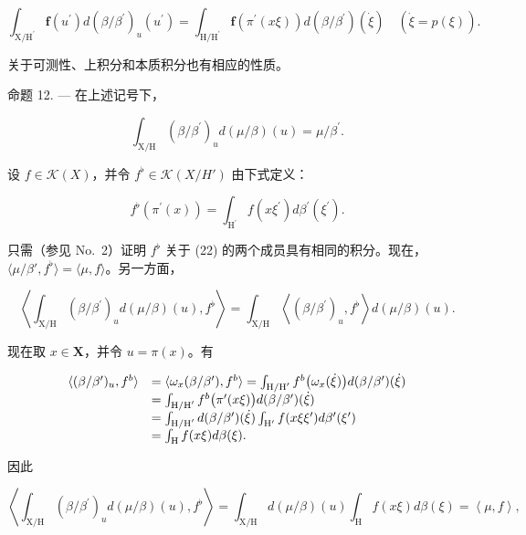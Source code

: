 \[
\int_ {\mathrm{X} / \mathrm{H} ^ {\prime}} \mathbf {f} (u ^ {\prime}) d (\beta / \beta^ {\prime}) _ {u} (u ^ {\prime}) = \int_ {\mathrm{H} / \mathrm{H} ^ {\prime}} \mathbf {f} \left(\pi^ {\prime} (x \xi)\right) d (\beta / \beta^ {\prime}) (\dot {\xi}) \quad \left(\dot {\xi} = p (\xi)\right).\tag{21}
\]

关于可测性、上积分和本质积分也有相应的性质。

命题 12. --- 在上述记号下，

\[
\int_ {\mathrm{X/H}} (\beta / \beta^ {\prime}) _ {u} d (\mu / \beta) (u) = \mu / \beta^ {\prime}.\tag{22}
\]

设 \(f \in \mathcal{K}(X)\)，并令 \(f^{\flat} \in \mathcal{K}(X/H')\) 由下式定义：

\[
f ^ {\flat} \left(\pi^ {\prime} (x)\right) = \int_ {\mathrm{H} ^ {\prime}} f \left(x \xi^ {\prime}\right) d \beta^ {\prime} \left(\xi^ {\prime}\right).
\]

只需（参见 No.~2）证明 \(f^{\flat}\) 关于 (22) 的两个成员具有相同的积分。现在，\(\langle \mu / \beta', f^{\flat} \rangle = \langle \mu, f \rangle\)。另一方面，

\[
\left\langle \int_ {\mathrm{X} / \mathrm{H}} \left(\beta / \beta^ {\prime}\right) _ {u} d (\mu / \beta) (u), f ^ {\flat} \right\rangle = \int_ {\mathrm{X} / \mathrm{H}} \left\langle \left(\beta / \beta^ {\prime}\right) _ {u}, f ^ {\flat} \right\rangle d (\mu / \beta) (u).
\]

现在取 \(x \in \mathbf{X}\)，并令 \(u = \pi(x)\)。有

\[
\begin{array}{r l} \langle (\beta / \beta^ {\prime}) _ {u}, f ^ {b} \rangle & = \langle \omega_ {x} (\beta / \beta^ {\prime}), f ^ {b} \rangle = \int_ {\mathrm{H/H} ^ {\prime}} f ^ {b} \big (\omega_ {x} (\dot {\xi}) \big) d (\beta / \beta^ {\prime}) (\dot {\xi}) \\ & = \int_ {\mathrm{H/H} ^ {\prime}} f ^ {b} \big (\pi^ {\prime} (x \xi) \big) d (\beta / \beta^ {\prime}) (\dot {\xi}) \\ & = \int_ {\mathrm{H/H} ^ {\prime}} d (\beta / \beta^ {\prime}) (\dot {\xi}) \int_ {\mathrm{H} ^ {\prime}} f (x \xi \xi^ {\prime}) d \beta^ {\prime} (\xi^ {\prime}) \\ & = \int_ {\mathrm{H}} f (x \xi) d \beta (\xi). \end{array}
\]

因此

\[
\left\langle \int_ {\mathrm{X/H}} (\beta / \beta^ {\prime}) _ {u} d (\mu / \beta) (u), f ^ {\flat} \right\rangle = \int_ {\mathrm{X/H}} d (\mu / \beta) (u) \int_ {\mathrm{H}} f (x \xi) d \beta (\xi) = \left\langle \mu , f \right\rangle ,
\]

